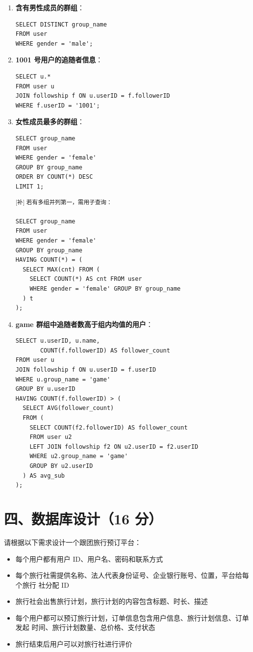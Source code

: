 \documentclass[11pt,a4paper]{article}
\newcommand{\supp}[1]{\textcolor{ansred}{\textsuperscript{[补] #1}}}
\begin{document}
\begin{enumerate}[label=(\arabic*),leftmargin=*]

  \item \textbf{含有男性成员的群组}：
\begin{verbatim}
SELECT DISTINCT group_name
FROM user
WHERE gender = 'male';
\end{verbatim}

  \item \textbf{1001 号用户的追随者信息}：
\begin{verbatim}
SELECT u.*
FROM user u
JOIN followship f ON u.userID = f.followerID
WHERE f.userID = '1001';
\end{verbatim}

  \item \textbf{女性成员最多的群组}：
\begin{verbatim}
SELECT group_name
FROM user
WHERE gender = 'female'
GROUP BY group_name
ORDER BY COUNT(*) DESC
LIMIT 1;
\end{verbatim}
  \supp{若有多组并列第一，需用子查询：}\\
\begin{verbatim}
SELECT group_name
FROM user
WHERE gender = 'female'
GROUP BY group_name
HAVING COUNT(*) = (
  SELECT MAX(cnt) FROM (
    SELECT COUNT(*) AS cnt FROM user
    WHERE gender = 'female' GROUP BY group_name
  ) t
);
\end{verbatim}

  \item \textbf{game 群组中追随者数高于组内均值的用户}：
\begin{verbatim}
SELECT u.userID, u.name,
       COUNT(f.followerID) AS follower_count
FROM user u
JOIN followship f ON u.userID = f.userID
WHERE u.group_name = 'game'
GROUP BY u.userID
HAVING COUNT(f.followerID) > (
  SELECT AVG(follower_count)
  FROM (
    SELECT COUNT(f2.followerID) AS follower_count
    FROM user u2
    LEFT JOIN followship f2 ON u2.userID = f2.userID
    WHERE u2.group_name = 'game'
    GROUP BY u2.userID
  ) AS avg_sub
);
\end{verbatim}

\end{enumerate}

\newpage
\section*{四、数据库设计（16 分）}

请根据以下需求设计一个跟团旅行预订平台：

\begin{itemize}[nosep]
  \item 每个用户都有用户 ID、用户名、密码和联系方式
  \item 每个旅行社需提供名称、法人代表身份证号、企业银行账号、位置，平台给每个旅行
        社分配 ID
  \item 旅行社会出售旅行计划，旅行计划的内容包含标题、时长、描述
  \item 每个用户都可以预订旅行计划，订单信息包含用户信息、旅行计划信息、订单发起
        时间、旅行计划数量、总价格、支付状态
  \item 旅行结束后用户可以对旅行社进行评价
\end{itemize}
\end{document}
